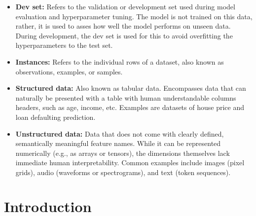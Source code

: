 \documentclass[12pt,openany, draft]{book}
\begin{document}
\begin{itemize}
    \item \textbf{Dev set:} Refers to the validation or development set used during model evaluation and hyperparameter tuning. The model is not trained on this data, rather, it is used to asses how well the model performs on unseen data. During development, the dev set is used for this to avoid overfitting the hyperparameters to the test set.
    \item \textbf{Instances:} Refers to the individual rows of a dataset, also known as observations, examples, or samples. 
    \item \textbf{Structured data:} Also known as tabular data. Encompasses data that can naturally be presented with a table with human understandable columns headers, such as age, income, etc. Examples are datasets of house price and loan defaulting prediction.
    \item \textbf{Unstructured data:} Data that does not come with clearly defined, semantically meaningful feature names. While it can be represented numerically (e.g., as arrays or tensors), the dimensions themselves lack immediate human interpretability. Common examples include images (pixel grids), audio (waveforms or spectrograms), and text (token sequences). 
\end{itemize}






\section{Introduction}
\end{document}
